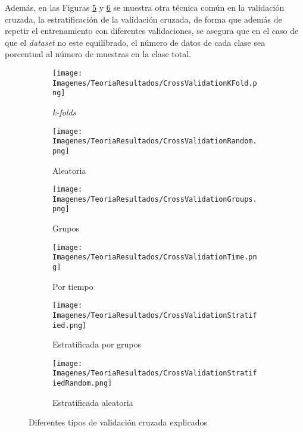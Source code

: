 \documentclass{report}
\begin{document}
Además, en las Figuras \ref{fig:CVEstratificadoGrupos} y \ref{fig:CVEstratificadoRandom} se muestra otra técnica común en la validación cruzada, la estratificación de la validación cruzada, de forma que además de repetir el entrenamiento con diferentes validaciones, se asegura que en el caso de que el \textit{dataset} no este equilibrado, el número de datos de cada clase sea porcentual al número de muestras en la clase total.

\begin{figure}[H]
	 	\centering
	 	\begin{subfigure}[b]{0.45\linewidth}
	 	\centering
	 		\texttt{[image: Imagenes/TeoriaResultados/CrossValidationKFold.png]}
                    \caption{ \textit{k-folds} } 
	 	        \label{fig:CVKFoldsTeoria}
	 	\end{subfigure}
	 	\centering
	 	\begin{subfigure}[b]{0.45\linewidth}
	 	\centering
	 		\texttt{[image: Imagenes/TeoriaResultados/CrossValidationRandom.png]}
                    \caption{ Aleatoria } 
	 	        \label{fig:CVRamdon}
	 	\end{subfigure}
	 	\begin{subfigure}[b]{0.45\linewidth}
	 	\centering
	 		\texttt{[image: Imagenes/TeoriaResultados/CrossValidationGroups.png]}
                    \caption{ Grupos } 
	 	        \label{fig:CVGrupos}
	 	\end{subfigure}
            \begin{subfigure}[b]{0.45\linewidth}
	 	\centering
	 		\texttt{[image: Imagenes/TeoriaResultados/CrossValidationTime.png]}
                    \caption{ Por tiempo } 
	 	        \label{fig:CVTiempo}
	 	\end{subfigure}
            \begin{subfigure}[b]{0.45\linewidth}
	 	\centering
	 		\texttt{[image: Imagenes/TeoriaResultados/CrossValidationStratified.png]}
                    \caption{ Estratificada por grupos } 
	 	        \label{fig:CVEstratificadoGrupos}
	 	\end{subfigure}
            \begin{subfigure}[b]{0.45\linewidth}
	 	\centering
	 		\texttt{[image: Imagenes/TeoriaResultados/CrossValidationStratifiedRandom.png]}
                    \caption{ Estratificada aleatoria } 
	 	        \label{fig:CVEstratificadoRandom}
	 	\end{subfigure}
	 	\caption{ Diferentes tipos de validación cruzada explicados \cite{ScklearnCV} } 
	 	\label{fig:CVTipos}
\end{figure}
\end{document}
